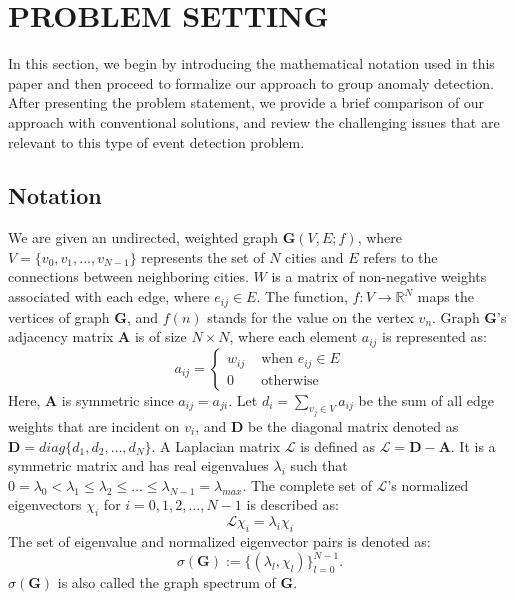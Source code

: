 \documentclass[twoside,leqno,twocolumn]{article}
\begin{document}
\section{PROBLEM SETTING} \label{sec:problem}
In this section, we begin by introducing the mathematical notation used in this paper and then proceed to formalize our approach to group anomaly detection. After presenting the problem statement, we provide a brief comparison of our approach with conventional solutions, and review the challenging issues that are relevant to this type of event detection problem.

\subsection{Notation}
\label{sec:notations}

We are given an undirected, weighted graph $\mathbf{G}(V,E;f)$, where $V=\{v_0,v_1,...,v_{N-1}\}$ represents the set of $N$ cities and $E$ refers to the connections between neighboring cities. $W$ is a matrix of non-negative weights associated with each edge, where $e_{ij}\in E$. The function, $f: V \rightarrow {\mathbb{R}}^N$ maps the vertices of graph $\mathbf{G}$, and $f(n)$ stands for the value on the vertex $v_n$. Graph $\mathbf{G}$'s adjacency matrix $\mathbf{A}$ is of size $N\times N$, where each element $a_{ij}$ is represented as:
\begin{equation}
a_{ij} = \left\{ \begin{array}{rl}
 w_{ij} &\mbox{ when $e_{ij}\in {E}$} \\
  0 &\mbox{ otherwise}
       \end{array} \right.
\end{equation}
Here, $\mathbf{A}$ is symmetric since $a_{ij}=a_{ji}$.
Let $d_i=\sum\limits_{v_j \in V}a_{ij}$ be the sum of all edge weights that are incident on $v_i$, and $\mathbf{D}$ be the diagonal matrix denoted as $\mathbf{D}=diag\{d_1,d_2,\ldots,d_N\}$. A Laplacian matrix $\mathcal{L}$ is defined as $\mathcal{L}=\mathbf{D-A}$. It is a symmetric matrix and has real eigenvalues $\lambda_{i}$ such that $0 = \lambda_{0} < \lambda_{1} \leq \lambda_{2} \leq \ldots \leq \lambda_{N-1} = \lambda_{max}$. The complete set of $\mathcal{L}$'s normalized eigenvectors $\chi_{i}$ for $i=0,1,2,...,N-1$ is described as:
\begin{equation}
\label{eq:eigenvalues}
\mathcal{L}\chi_{i}=\lambda_{i}\chi_{i}
\end{equation}
The set of eigenvalue and normalized eigenvector pairs is denoted as:
\begin{equation}
\label{eq:spectrum}
\sigma({\mathbf{G}}):=\{(\lambda_l,\chi_l)\}_{l=0}^{N-1}.
\end{equation}$\sigma({\mathbf{G}})$ is also called the graph spectrum of $\mathbf{G}$.
\end{document}
